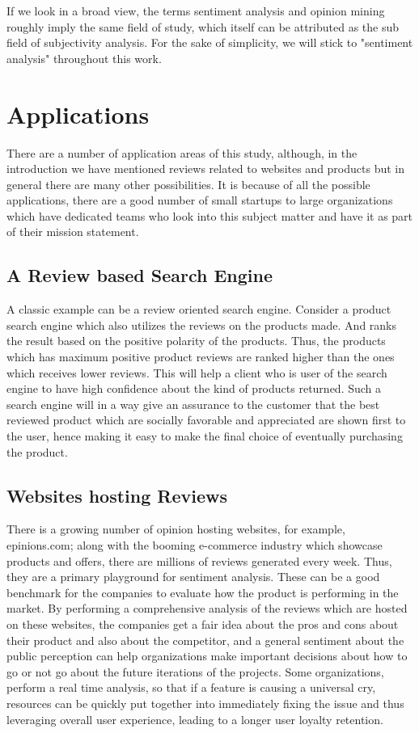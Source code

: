 If we look in a broad view, the terms sentiment analysis and opinion mining roughly imply the same field of study, which itself can be attributed as the sub field of subjectivity analysis. For the sake of simplicity, we will stick to "sentiment analysis" throughout this work. 

\section{Applications}
There are a number of application areas of this study, although, in the introduction we have mentioned reviews related to websites and products but in general there are many other possibilities. It is because of all the possible applications, there are a good number of small startups to large organizations which have dedicated teams who look into this subject matter and have it as part of their mission statement.


\subsection{A Review based Search Engine}
A classic example can be a review oriented search engine. Consider a product search engine which also utilizes the reviews on the products made. And ranks the result based on the positive polarity of the products. Thus, the products which has maximum positive  product reviews are ranked higher than the ones which receives lower reviews. This will help a client who is user of the search engine to have high confidence about the kind of products returned. Such a search engine will in a way give an assurance to the customer that the best reviewed product which are socially favorable and appreciated are shown first to the user, hence making it easy to make the final choice of eventually purchasing the product. 

\subsection{Websites hosting Reviews}
There is a growing number of opinion hosting websites, for example, epinions.com; along with the booming e-commerce industry which showcase products and offers, there are millions of reviews generated every week. Thus, they are a primary playground for sentiment analysis. These can be a good benchmark for the companies to evaluate how the product is performing in the market. By performing a comprehensive analysis of the reviews which are hosted on these websites, the companies get a fair idea about the pros and cons about their product and also about the competitor, and a general sentiment about the public perception can help organizations make important decisions about how to go or not go about the future iterations of the projects. Some organizations, perform a real time analysis, so that if a feature is causing a universal cry, resources can be quickly put together into immediately fixing the issue and thus leveraging overall user experience, leading to a longer user loyalty retention.

